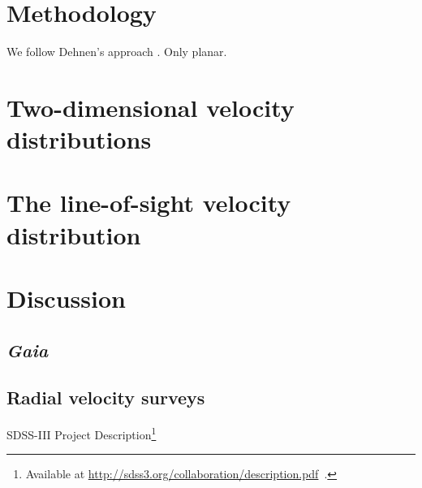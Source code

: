 \documentclass[12pt,preprint]{aastex}
\newcommand{\Gaia}{\emph{Gaia}}
\begin{document}
\section{Methodology}

We follow Dehnen's approach \citep{dehnen00a}. Only planar.


\section{Two-dimensional velocity distributions}


\section{The line-of-sight velocity distribution}


\section{Discussion}

\subsection{\Gaia}

\subsection{Radial velocity surveys}

SDSS-III Project Description\footnote{Available at
  \url{http://sdss3.org/collaboration/description.pdf}~.}
\end{document}
